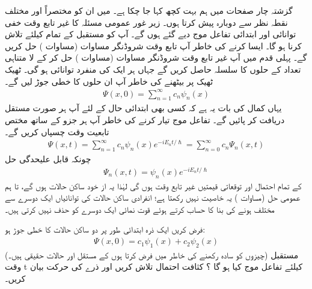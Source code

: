 گزشتہ چار صفحات میں ہم بہت کچھ کہا جا چکا ہے۔ میں ان کو مختصراً اور مختلف نقطہ نظر سے دوبارہ پیش کرتا ہوں۔ زیر غور عمومی مسئلہ کا غیر تابع وقت خفی توانائی    اور ابتدائی تفاعل موج   دیے  گئے ہوں گے۔ آپ کو مستقبل کے تمام   کیلئے   تلاش کرنا ہو گا۔ ایسا کرنے کی خاطر آپ تابع وقت شروڈنگر مساوات  (مساوات ) حل کریں گے۔ پہلی قدم میں  آپ غیر تابع وقت شروڈنگر مساوات  (مساوات )  حل کر کے  لا متناہی تعداد کے حلوں  کا سلسلہ    حاصل کریں گے جہاں ہر ایک
 کی منفرد توانائی   ہو گی۔ ٹھیک ٹھیک  پر بیٹھنے کی خاطر آپ ان حلوں کا  خطی جوڑ لیں گے۔
\begin{align}\label{مساوات_شروڈنگر_ساکن_حالات_کا_خطی_جوڑ}
\Psi (x,0) = \sum_{n=1}^{\infty} c_{n} \psi_{n}(x)
\end{align}
یہاں کمال کی  بات یہ ہے کہ کسی بھی ابتدائی حال کے لئے آپ ہر صورت  مستقل  دریافت کر پائیں گے۔ تفاعل موج   تیار کرنے کی خاطر آپ ہر جزو کے ساتھ مختص تابعیت وقت  چسپاں کریں گے۔ 
\begin{align}\label{مساوات_شروڈنگر_عمومی_حل_مجموعہ}
\Psi (x,t) = \sum_{n=1}^{\infty} c_{n} \psi_{n}(x)e^{-iE_{n}t/\hslash} = \sum_{n=0}^{\infty} c_{n} \Psi_{n} (x,t)
\end{align}
چونکہ قابل علیحدگی حل
\begin{align}\label{مساوات_شروڈنگر_تمام_عمومی_حل}
\Psi_{n} (x,t) = \psi_{n}(x) e^{-iE_{n}t/\hslash}
\end{align}
کے تمام احتمال اور توقعاتی قیمتیں غیر تابع وقت ہوں گی لہٰذا یہ  از خود ساکن حالات ہوں گے، تا ہم عمومی حل  (مساوات ) یہ خاصیت نہیں رکھتا ہے؛  انفرادی ساکن حالات کی توانائیاں ایک دوسرے سے مختلف ہونے کی بنا  کا حساب کرتے ہوئے  قوت نمائی ایک دوسرے کو حذف نہیں کرتی ہیں۔ 


فرض کریں  ایک ذرہ ابتدائی طور پر دو ساکن حالات کا خطی جوڑ ہو: 
\begin{align*}
\Psi (x,0) = c_{1} \psi_{1}(x) + c_{2} \psi_{2}(x) 
\end{align*}
(چیزوں کو سادہ رکھنے کی خاطر میں فرض کرتا ہوں کے مستقل   اور حالات   حقیقی ہیں۔) مستقبل وقت t کیلئے تفاعل موج   کیا ہو گا ؟ کثافت احتمال تلاش کریں اور ذرے کی حرکت  بیان کریں۔ 

